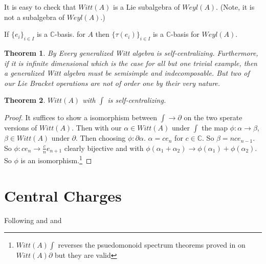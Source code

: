\documentclass[10pt, oneside]{article}
\newcommand{\C}{\mathbb{C}}
\newtheorem{thm}{Theorem}
\begin{document}
It is easy to check that $Witt(A)$ is a Lie subalgebra of $Weyl(A)$. (Note,
it is not a subalgebra of $Weyl(A)$.)

If $\{ e_i\}_{i \in I}$ is a $\C$-basis.
for $A$ then $\{ \tau(e_i) \}_{i \in I}$
is a $\C$-basis for $Weyl(A)$.
\begin{thm}
By \cite{pakianathan2010generalizedwittalgebrasvariable} Every generalized Witt algebra is self-centralizing. 
Furthermore, if it is infinite dimensional which is the case for all but one trivial example, then a generalized Witt algebra must be semisimple and 
indecomposable. But two of our Lie Bracket operations are not of order one by their very nature.
\end{thm}
\begin{thm}
   $Witt(A)$ with $\int$ is self-centralizing.
\end{thm}
\begin{proof}
   It suffices to show a isomorphism between $\int \to \partial$ on the two sperate versions of $Witt(A)$. Then with our $\alpha \in Witt(A)$ under $\int$ the map $\phi: \alpha \to \beta$, $\beta \in Witt(A)$ under $\partial$. Then choosing $\phi: \partial \alpha$. $\alpha = c e_{n}$ for $c \in \C$. So $\beta = n c e_{n-1}$. 
   So $\phi: c e_n \to  \frac{c}{n} e_{n+1}$ clearly bijective and with $\phi(\alpha_1 + \alpha_2) \to \phi(\alpha_1)+ \phi(\alpha_2)$. So $\phi$ is an isomorphism.\footnote{$Witt(A) \int$ reverses the psuedomonoid spectrum theorems proved in \cite{pakianathan2010generalizedwittalgebrasvariable} on $Witt(A) \partial$ but they are valid} 
\end{proof}
\section{Central Charges}
   Following \cite{teschner2017guidetwodimensionalconformalfield} and \cite{} and 
\end{document}
